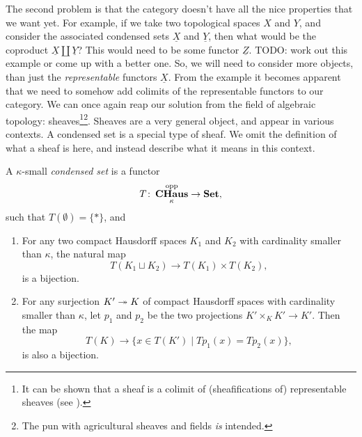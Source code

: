\documentclass{article}
\DeclareMathOperator{\opp}{opp}
\DeclareMathOperator{\CHaus}{\mathbf{CHaus}}
\begin{document}
The second problem is that the category doesn't have all
the nice properties that we want yet. For example,
if we take two topological spaces $X$ and $Y$, and
consider the associated condensed sets $\underline{X}$
and $\underline{Y}$, then what would be the coproduct
$\underline{X} \coprod \underline{Y}$? This would need
to be some functor $\underline{Z}$. TODO: work out this
example or come up with a better one.
So, we will need to consider more objects, than just
the \emph{representable} functors $\underline{X}$.
From the example it becomes apparent that we need
to somehow add colimits of the representable functors
to our category. We can once again reap our solution from
the field of algebraic topology: sheaves\footnote{
    It can be shown that a sheaf is a colimit of (sheafifications of) representable
    sheaves (see
    \cite[\href{https://stacks.math.columbia.edu/tag/0GLW}{Lemma 0GLW}]{stacks-project}).
}\footnote{
    The pun with agricultural sheaves and fields \emph{is} intended.
}. Sheaves are a very general object, and appear in various
contexts. A condensed set is a special type of sheaf.
We omit the definition of what a sheaf is here, and instead
describe what it means in this context.
\begin{definition}
    A $\kappa$-small \emph{condensed set} is a functor
    \begin{equation*}
        T \colon \CHaus_{\kappa}^{\opp} \to \Set,
    \end{equation*}
    such that $T(\emptyset) = \{*\}$, and
    \begin{enumerate}
        \item For any two compact Hausdorff spaces $K_1$ and $K_2$ with cardinality
              smaller than $\kappa$, the natural map
              \begin{equation*}
                  T(K_1 \sqcup K_2) \to T(K_1) \times T(K_2),
              \end{equation*}
              is a bijection.
        \item For any surjection $K' \twoheadrightarrow K$ of compact Hausdorff spaces
              with cardinality smaller than $\kappa$, let $p_1$ and $p_2$
              be the two projections $K'\times_K K' \to K'$. Then the map
              \begin{equation*}
                  T(K) \to \{x \in T(K') \mid Tp_1(x) = Tp_2(x)\},
              \end{equation*}
              is also a bijection.
    \end{enumerate}
\end{definition}
\end{document}
